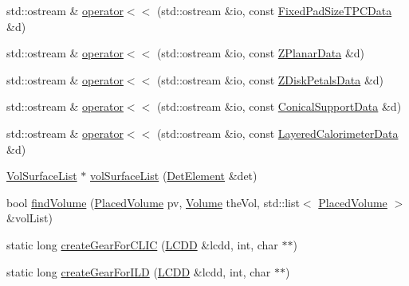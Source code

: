 \begin{DoxyCompactItemize}
\item 
std\+::ostream \& \hyperlink{namespace_d_d4hep_1_1_d_d_rec_aa514e41eeafbaef792fcf63b9f571f79}{operator$<$$<$} (std\+::ostream \&io, const \hyperlink{namespace_d_d4hep_1_1_d_d_rec_a4fe537dc27f78fad18b8182f6f167ca1}{Fixed\+Pad\+Size\+T\+P\+C\+Data} \&d)
\item 
std\+::ostream \& \hyperlink{namespace_d_d4hep_1_1_d_d_rec_a9b0e1617bdabefc79ff68ab36353b78b}{operator$<$$<$} (std\+::ostream \&io, const \hyperlink{namespace_d_d4hep_1_1_d_d_rec_a33d4dff6a0b5ce47e490b050a3c5f69a}{Z\+Planar\+Data} \&d)
\item 
std\+::ostream \& \hyperlink{namespace_d_d4hep_1_1_d_d_rec_abb36ebe6cd2bdcb3a1bf8dd305d70c75}{operator$<$$<$} (std\+::ostream \&io, const \hyperlink{namespace_d_d4hep_1_1_d_d_rec_a589fa302569ee79d91b34ff0d97d4a78}{Z\+Disk\+Petals\+Data} \&d)
\item 
std\+::ostream \& \hyperlink{namespace_d_d4hep_1_1_d_d_rec_ae4c258c58c53ab806bedda2948d0acca}{operator$<$$<$} (std\+::ostream \&io, const \hyperlink{namespace_d_d4hep_1_1_d_d_rec_ad032e209cba53400573169b32816f1c9}{Conical\+Support\+Data} \&d)
\item 
std\+::ostream \& \hyperlink{namespace_d_d4hep_1_1_d_d_rec_a56c7e8b362aec38f71cfccb7b1bfd0a4}{operator$<$$<$} (std\+::ostream \&io, const \hyperlink{namespace_d_d4hep_1_1_d_d_rec_ab7bf707189c3166efa20740e6f7524b9}{Layered\+Calorimeter\+Data} \&d)
\item 
\hyperlink{struct_d_d4hep_1_1_d_d_rec_1_1_vol_surface_list}{Vol\+Surface\+List} $\ast$ \hyperlink{namespace_d_d4hep_1_1_d_d_rec_a59c95bbf8cdb6547cfa3f9fa969d4031}{vol\+Surface\+List} (\hyperlink{class_d_d4hep_1_1_geometry_1_1_det_element}{Det\+Element} \&det)
\item 
bool \hyperlink{namespace_d_d4hep_1_1_d_d_rec_a7b23370837eb2d8876a1e18bb258fd3f}{find\+Volume} (\hyperlink{class_d_d4hep_1_1_geometry_1_1_placed_volume}{Placed\+Volume} pv, \hyperlink{class_d_d4hep_1_1_geometry_1_1_volume}{Volume} the\+Vol, std\+::list$<$ \hyperlink{class_d_d4hep_1_1_geometry_1_1_placed_volume}{Placed\+Volume} $>$ \&vol\+List)
\item 
static long \hyperlink{namespace_d_d4hep_1_1_d_d_rec_a8eda7f805466b45870d45a7eea090a98}{create\+Gear\+For\+C\+L\+IC} (\hyperlink{class_d_d4hep_1_1_geometry_1_1_l_c_d_d}{L\+C\+DD} \&lcdd, int, char $\ast$$\ast$)
\item 
static long \hyperlink{namespace_d_d4hep_1_1_d_d_rec_aa9a44ffd1338e5e01378ca9ce61656cc}{create\+Gear\+For\+I\+LD} (\hyperlink{class_d_d4hep_1_1_geometry_1_1_l_c_d_d}{L\+C\+DD} \&lcdd, int, char $\ast$$\ast$)

\end{DoxyCompactItemize}
